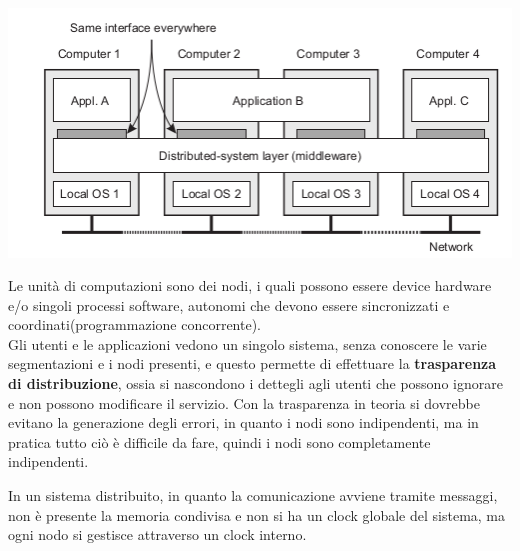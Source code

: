 \documentclass[a4paper,12pt, oneside]{book}
\begin{document}
\begin{center}
\includegraphics[scale=2.5]{img/cli.png}
\end{center}
Le unità di computazioni sono dei nodi, i quali possono essere device hardware e/o singoli processi
software, autonomi che devono essere sincronizzati e coordinati(programmazione concorrente).\\
Gli utenti e le applicazioni vedono un singolo sistema, senza conoscere le varie segmentazioni
e i nodi presenti, e questo permette di effettuare la \textbf{trasparenza di distribuzione},
ossia si nascondono i dettegli agli utenti che possono ignorare e non possono modificare il servizio.\newline
Con la trasparenza in teoria si dovrebbe evitano la generazione degli errori, in quanto i nodi sono
indipendenti, ma in pratica tutto ciò è difficile da fare, quindi i nodi sono completamente indipendenti.

In un sistema distribuito, in quanto la comunicazione avviene tramite messaggi, non è presente la memoria
condivisa e non si ha un clock globale del sistema, ma ogni nodo si gestisce attraverso un clock interno.
\end{document}
